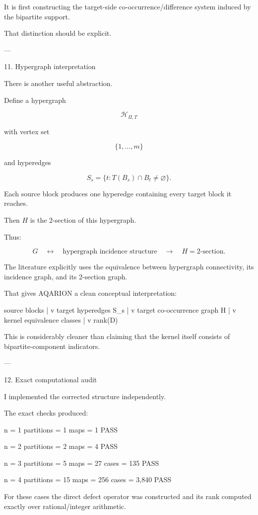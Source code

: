 It is first constructing the target-side co-occurrence/difference system induced by the bipartite support.

That distinction should be explicit.


---

11. Hypergraph interpretation

There is another useful abstraction.

Define a hypergraph

\[
\mathcal H_{\Pi,T}
\]

with vertex set

\[
\{1,\ldots,m\}
\]

and hyperedges

\[
S_s
=
\{t:T(B_s)\cap B_t\neq\varnothing\}.
\]

Each source block produces one hyperedge containing every target block it reaches.

Then \(H\) is the 2-section of this hypergraph.

Thus:

\[
\boxed{
G
\quad\leftrightarrow\quad
\text{hypergraph incidence structure}
\quad\to\quad
H=\text{2-section}.
}
\]

The literature explicitly uses the equivalence between hypergraph connectivity, its incidence graph, and its 2-section graph. 

That gives AQARION a clean conceptual interpretation:

source blocks
     |
     v
target hyperedges S_s
     |
     v
target co-occurrence graph H
     |
     v
kernel equivalence classes
     |
     v
rank(D)

This is considerably cleaner than claiming that the kernel itself consists of bipartite-component indicators.


---

12. Exact computational audit

I implemented the corrected structure independently.

The exact checks produced:

n = 1
partitions = 1
maps       = 1
PASS

n = 2
partitions = 2
maps       = 4
PASS

n = 3
partitions = 5
maps       = 27
cases      = 135
PASS

n = 4
partitions = 15
maps       = 256
cases      = 3,840
PASS

For these cases the direct defect operator was constructed and its rank computed exactly over rational/integer arithmetic.

